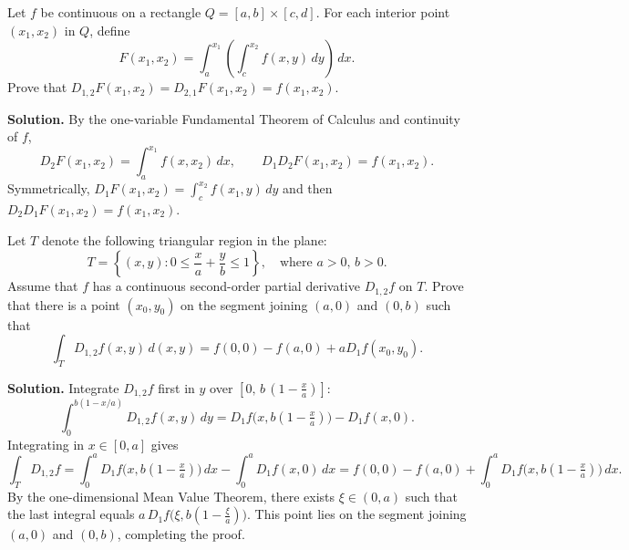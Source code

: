 \begin{problembox}
Let \( f \) be continuous on a rectangle \( Q = [a, b] \times [c, d] \). For each interior point \( (x_1, x_2) \) in \( Q \), define
\[F(x_1, x_2) = \int_a^{x_1} \left( \int_c^{x_2} f(x, y) \, dy \right) \, dx.\]
Prove that \( D_{1,2} F(x_1, x_2) = D_{2,1} F(x_1, x_2) = f(x_1, x_2) \).
\end{problembox}

\noindent\textbf{Solution.}
By the one-variable Fundamental Theorem of Calculus and continuity of $f$,
\[ D_2 F(x_1,x_2) = \int_a^{x_1} f(x,x_2)\,dx, \qquad D_1 D_2 F(x_1,x_2) = f(x_1,x_2). \]
Symmetrically, $D_1 F(x_1,x_2)=\int_c^{x_2} f(x_1,y)\,dy$ and then $D_2 D_1 F(x_1,x_2)=f(x_1,x_2)$.

\begin{problembox}
Let \( T \) denote the following triangular region in the plane:
\[T = \left\{ (x, y) : 0 \leq \frac{x}{a} + \frac{y}{b} \leq 1 \right\}, \quad \text{where } a > 0, \, b > 0.\]
Assume that \( f \) has a continuous second-order partial derivative \( D_{1,2} f \) on \( T \). Prove that there is a point \( (x_0, y_0) \) on the segment joining \( (a, 0) \) and \( (0, b) \) such that
\[\int_T D_{1,2} f(x, y) \, d(x, y) = f(0, 0) - f(a, 0) + aD_1 f(x_0, y_0).\]
\end{problembox}

\noindent\textbf{Solution.}
Integrate $D_{1,2}f$ first in $y$ over $[0,\,b\,(1-\tfrac{x}{a})]$:
\[ \int_0^{b(1-x/a)} D_{1,2}f(x,y)\,dy = D_1 f\big(x, b(1-\tfrac{x}{a})\big) - D_1 f(x,0). \]
Integrating in $x\in[0,a]$ gives
\[ \int_T D_{1,2}f = \int_0^a D_1 f\big(x, b(1-\tfrac{x}{a})\big)\,dx - \int_0^a D_1 f(x,0)\,dx = f(0,0)-f(a,0) + \int_0^a D_1 f\big(x, b(1-\tfrac{x}{a})\big)\,dx. \]
By the one-dimensional Mean Value Theorem, there exists $\xi\in(0,a)$ such that the last integral equals $a\,D_1 f\big(\xi, b(1-\tfrac{\xi}{a})\big)$. This point lies on the segment joining $(a,0)$ and $(0,b)$, completing the proof.